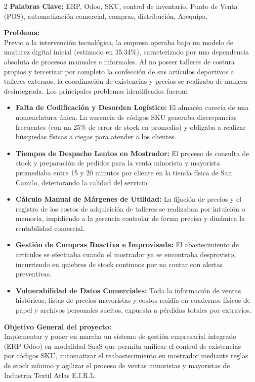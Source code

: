 \documentclass[12pt]{article}
\begin{document}
\newpage
\begin{multicols}{2}
\textbf{Palabras Clave:} ERP, Odoo, SKU, control de inventario, Punto de Venta (POS), automatización comercial, compras, distribución, Arequipa.

\textbf{Problema:}\\
Previo a la intervención tecnológica, la empresa operaba bajo un modelo de madurez digital inicial (estimado en 35.34\%), caracterizado por una dependencia absoluta de procesos manuales e informales. Al no poseer talleres de costura propios y tercerizar por completo la confección de sus artículos deportivos a talleres externos, la coordinación de existencias y precios se realizaba de manera desintegrada. Los principales problemas identificados fueron:
\begin{itemize}
    \item \textbf{Falta de Codificación y Desorden Logístico:} El almacén carecía de una nomenclatura única. La ausencia de códigos SKU generaba discrepancias frecuentes (con un 25\% de error de stock en promedio) y obligaba a realizar búsquedas físicas a ciegas para atender a los clientes.
    \item \textbf{Tiempos de Despacho Lentos en Mostrador:} El proceso de consulta de stock y preparación de pedidos para la venta minorista y mayorista promediaba entre 15 y 20 minutos por cliente en la tienda física de San Camilo, deteriorando la calidad del servicio.
    \item \textbf{Cálculo Manual de Márgenes de Utilidad:} La fijación de precios y el registro de los costos de adquisición de talleres se realizaban por intuición o memoria, impidiendo a la gerencia controlar de forma precisa y dinámica la rentabilidad comercial.
    \item \textbf{Gestión de Compras Reactiva e Improvisada:} El abastecimiento de artículos se efectuaba cuando el mostrador ya se encontraba desprovisto, incurriendo en quiebres de stock continuos por no contar con alertas preventivas.
    \item \textbf{Vulnerabilidad de Datos Comerciales:} Toda la información de ventas históricas, listas de precios mayoristas y costos residía en cuadernos físicos de papel y archivos personales sueltos, expuesta a pérdidas totales por extravíos.
\end{itemize}

\textbf{Objetivo General del proyecto:}\\
Implementar y poner en marcha un sistema de gestión empresarial integrado (ERP Odoo) en modalidad SaaS que permita unificar el control de existencias por códigos SKU, automatizar el reabastecimiento en mostrador mediante reglas de stock mínimo y agilizar el proceso de ventas minoristas y mayoristas de Industria Textil Atlas E.I.R.L.


\end{multicols}
\end{document}
